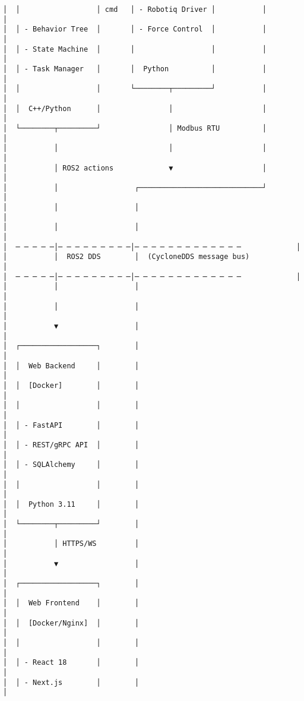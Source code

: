 \documentclass[
]{article}
\begin{document}
\begin{verbatim}
│  │                  │ cmd   │ - Robotiq Driver │           │         │
│  │ - Behavior Tree  │       │ - Force Control  │           │         │
│  │ - State Machine  │       │                  │           │         │
│  │ - Task Manager   │       │  Python          │           │         │
│  │                  │       └────────┬─────────┘           │         │
│  │  C++/Python      │                │                     │         │
│  └────────┬─────────┘                │ Modbus RTU          │         │
│           │                          │                     │         │
│           │ ROS2 actions             ▼                     │         │
│           │                  ┌─────────────────────────────┘         │
│           │                  │                                       │
│           │                  │                                       │
│  ─ ─ ─ ─ ─│─ ─ ─ ─ ─ ─ ─ ─ ─│─ ─ ─ ─ ─ ─ ─ ─ ─ ─ ─ ─ ─             │
│           │  ROS2 DDS        │  (CycloneDDS message bus)             │
│  ─ ─ ─ ─ ─│─ ─ ─ ─ ─ ─ ─ ─ ─│─ ─ ─ ─ ─ ─ ─ ─ ─ ─ ─ ─ ─             │
│           │                  │                                       │
│           │                  │                                       │
│           ▼                  │                                       │
│  ┌──────────────────┐        │                                       │
│  │  Web Backend     │        │                                       │
│  │  [Docker]        │        │                                       │
│  │                  │        │                                       │
│  │ - FastAPI        │        │                                       │
│  │ - REST/gRPC API  │        │                                       │
│  │ - SQLAlchemy     │        │                                       │
│  │                  │        │                                       │
│  │  Python 3.11     │        │                                       │
│  └────────┬─────────┘        │                                       │
│           │ HTTPS/WS         │                                       │
│           ▼                  │                                       │
│  ┌──────────────────┐        │                                       │
│  │  Web Frontend    │        │                                       │
│  │  [Docker/Nginx]  │        │                                       │
│  │                  │        │                                       │
│  │ - React 18       │        │                                       │
│  │ - Next.js        │        │                                       │

\end{verbatim}
\end{document}
